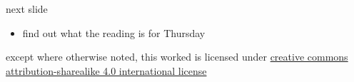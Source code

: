 \documentclass[10pt,t,usenames,dvipsnames]{beamer}
\begin{document}
  \begin{frame}{next slide}
    \begin{itemize}
      \item find out what the reading is for Thursday
    \end{itemize}
  \end{frame}

  \begin{frame}[c]
    \begin{center}\ccbysa\end{center}

    except where otherwise noted, this worked is licensed under
    \href{http://creativecommons.org/licenses/by-sa/4.0/}{creative commons
    attribution-sharealike 4.0 international license}
  \end{frame}
\end{document}
